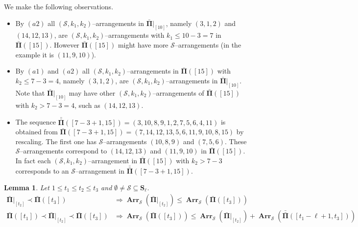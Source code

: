 \documentclass[letterpaper,11pt]{article}
\newtheorem{lemma}[theorem]{Lemma}
\theoremstyle{definition}
\theoremstyle{remark}
\renewcommand{\le}{\leqslant}
\newcommand{\bS}{\mathbf{S}}
\newcommand{\Arr}{\ensuremath{\operatorname{\mathbf{Arr}}}}
\newcommand{\barPi}{\bar {\mathbf \Pi}}
\newcommand{\barbarPi}{{\bar{\bar {\mathbf \Pi}}}}
\newcommand{\cS}{\mathcal{S}}
\newcommand{\subseq}{\prec}
\begin{document}
We make the following observations.
\begin{itemize}
	\item[(i)] By  $(a2)$ all $(\cS,k_1,k_2)$--arrangements in $\barPi|_{[10]}$, namely $(3,1,2)$ and $(14,12,13)$, are $(\cS,k_1,k_2)$--arrangements with $k_1\le 10-3=7$ in $\barPi([15])$. However $\barPi([15])$ might have more $\cS$--arrangements (in the example it is $(11,9,10)$). 
	\item[(ii)] By $(a1)$ and $(a2)$ all $(\cS,k_1,k_2)$--arrangements in $\barPi([15])$ with $k_2\le 7-3=4$, namely $(3,1,2)$, are $(\cS,k_1,k_2)$--arrangements in $\barPi|_{[10]}$. Note that $\barPi|_{[10]}$ may have other $(\cS,k_1,k_2)$--arrangements of $\barPi([15])$ with $k_2 > 7-3=4$, such as $(14,12,13)$. 
	\item[(iii)] The sequence $\barbarPi([7-3+1,15])=(3,10,8,9,1,2,7,5,6,4,11)$ is obtained from $\barPi([7-3+1,15])=(7,14,12,13,5,6,11,9,10,8,15)$ by rescaling. The first one has $\cS$--arrangements $(10,8,9)$ and $(7,5,6)$. These $\cS$--arrangements correspond to $(14,12,13)$  and  $(11,9,10)$ in $\barPi([15])$. In fact each $(\cS,k_1,k_2)$--arrangement in $\barPi([15])$ with $k_2 > 7-3$ corresponds to an $\cS$--arrangement in $\barbarPi([7-3+1,15])$. 
\end{itemize}

\begin{lemma}\label{Lem:Inclusion:Implication}
	Let $1\le t_1\le t_2\le t_3$ and $\emptyset\neq\cS\subseteq \bS_\ell$.
	\begin{align}
		\label{Eq:Inclusion:Implication1}
		\barPi|_{[t_2]}\subseq \barPi([t_3]) &\Rightarrow	\Arr_{\cS}(\barPi|_{[t_2]})\le \Arr_{\cS}(\barPi([t_3])) \\
		\label{Eq:Inclusion:Implication2}
		\barPi([t_1])\subseq \barPi|_{[t_2]}\subseq \barPi([t_3]) &\Rightarrow	
		\Arr_{\cS}(\barPi([t_3]))\le \Arr_{\cS}(\barPi|_{[t_2]}) +  \Arr_{\cS}(\barbarPi([t_1-\ell+1,t_3]))
	\end{align}	
\end{lemma}
\end{document}
